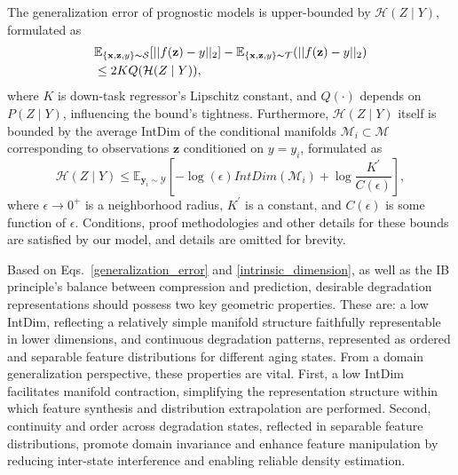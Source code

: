 \documentclass[lettersize,journal]{IEEEtran}
\begin{document}
The generalization error of prognostic models is upper-bounded by $\mathcal{H}(Z \mid Y)$, formulated as
\begin{align}
    & \mathbb{E}_{\{\mathbf{x},\mathbf{z},y\}\thicksim \mathcal{S}}[||f(\mathbf{z})-{y}||_2] -\mathbb{E}_{\{\mathbf{x},\mathbf{z},y\}\thicksim \mathcal{T}}(||f(\mathbf{z})-{y}||_2) \notag \\
    & \leq 2KQ(\mathcal{H}(Z \mid Y)), \label{generalization_error}
\end{align}
where $K$ is down-task regressor's Lipschitz constant, and $Q(\cdot)$ depends on $P(Z \mid Y)$, influencing the bound's tightness.
Furthermore, $\mathcal{H}(Z \mid Y)$ itself is bounded by the average IntDim of the conditional manifolds $\mathcal{M}_i\subset\mathcal{M}$ corresponding to observations $\boldsymbol{z}$ conditioned on $y = y_{i}$, formulated as
\begin{equation}
    \mathcal{H}(Z \mid Y) \leq \mathbb{E}_{\mathbf{y}_{i} \sim \mathcal{Y}}[-\log(\epsilon)IntDim(\mathcal{M}_i)+\log\frac{K^{\prime}}{C(\epsilon)}],
    \label{intrinsic_dimension} 
\end{equation}
where $\epsilon \to 0^{+}$ is a neighborhood radius, $K^{\prime}$ is a constant, and $C(\epsilon)$ is some function of $\epsilon$. 
Conditions, proof methodologies and other details for these bounds \cite{Ghosh_Motani_2023, 10.5555/3692070.3694510} are satisfied by our model, and details are omitted for brevity.

Based on Eqs.~\eqref{generalization_error} and \eqref{intrinsic_dimension}, as well as the IB principle's balance between compression and prediction, desirable degradation representations should possess two key geometric properties. These are: 
a low IntDim, reflecting a relatively simple manifold structure faithfully representable in lower dimensions, and continuous degradation patterns, represented as ordered and separable feature distributions for different aging states.
From a domain generalization perspective, these properties are vital. First, a low IntDim facilitates manifold contraction, simplifying the representation structure within which feature synthesis and distribution extrapolation are performed.
Second, continuity and order across degradation states, reflected in separable feature distributions, promote domain invariance and enhance feature manipulation by reducing inter-state interference and enabling reliable density estimation.
\end{document}
